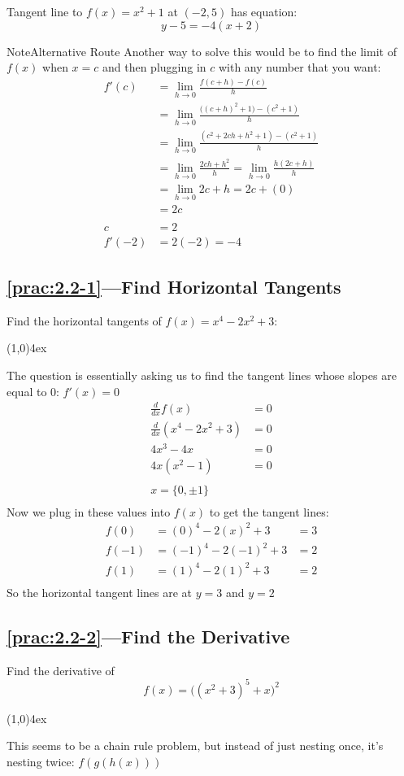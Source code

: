 \documentclass{MathNotes}
\newenvironment{note}[1]{\begin{YellowBox}{Note}{#1}}{\end{YellowBox}}
\newcommand{\br}{
\begin{center}
\line(1,0){4ex}
\end{center}}
\begin{document}
Tangent line to $f(x)=x^2+1$ at $(-2, 5)$ has equation: $$y-5=-4(x+2)$$
\begin{note}{Alternative Route}
    Another way to solve this would be to find the limit of $f(x)$ when $x=c$ 
    and then plugging in $c$ with any number that you want:
    \begin{align*}
        f'(c)&=\lim_{h\to 0}\frac{f(c+h)-f(c)}{h} \\
        &=\lim_{h\to 0}\frac{\bigl((c+h)^2+1\bigr)-(c^2+1)}{h} \\
        &=\lim_{h\to 0}\frac{(c^2+2ch+h^2+1)-(c^2+1)}{h} \\
        &=\lim_{h\to 0}\frac{2ch+h^2}{h} = \lim_{h\to 0}\frac{h(2c+h)}{h}\\
        &=\lim_{h\to 0} 2c+h=2c+(0)\\
        &=2c\\
        \\
        c&=2\\
        f'(-2)&=2(-2)=-4
    \end{align*}
\end{note}

\newpage
\subsection*{\ref{prac:2.2-1}---Find Horizontal Tangents}\label{ans:2.2-1}
Find the horizontal tangents of $f(x)=x^4-2x^2+3$:
\br
The question is essentially asking us to find the tangent lines whose
slopes are equal to 0: $f'(x)=0$
\begin{align*}
    \frac{d}{dx}f(x)&=0\\
    \frac{d}{dx}(x^4-2x^2+3)&=0\\
    4x^3-4x &=0\\
    4x(x^2-1)&=0\\
    \\
    x=\{0, \pm 1\}\\
\end{align*}
Now we plug in these values into $f(x)$ to get the tangent lines:
\begin{align*}
    f(0)&=(0)^4-2(x)^2+3&=3\\
    f(-1)&=(-1)^4-2(-1)^2+3&=2\\
    f(1)&=(1)^4-2(1)^2+3&=2\\
\end{align*}
So the horizontal tangent lines are at $y=3$ and $y=2$

\subsection*{\ref{prac:2.2-2}---Find the Derivative}\label{ans:2.2-2}
Find the derivative of $$f(x)=\big((x^2+3)^5+x\big)^2$$
\br
This seems to be a chain rule problem, but instead of just nesting once,
it's nesting twice: $f(g(h(x)))$
\end{document}
